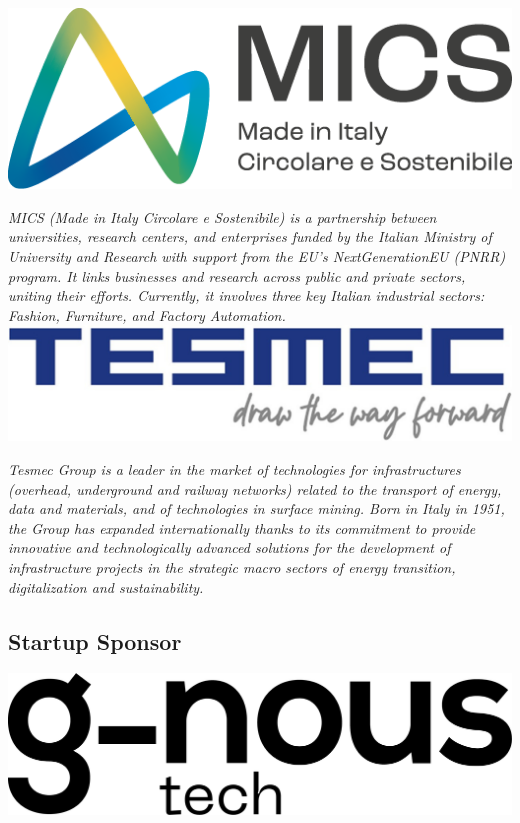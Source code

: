 \documentclass[
	openany, %
	parskip=full, %
	12pt, %
	a4paper, %
]{conferencebooklet} %
\begin{document}
\begin{multicols*}{2}
    \hfill\includegraphics[width=\sponsorscaling\linewidth]{logos/mics.png}\hspace*{\fill}
    
    \textit{MICS (Made in Italy Circolare e Sostenibile) is a partnership between universities, research centers, and enterprises funded by the Italian Ministry of University and Research with support from the EU's NextGenerationEU (PNRR) program. It links businesses and research across public and private sectors, uniting their efforts. Currently, it involves three key Italian industrial sectors: Fashion, Furniture, and Factory Automation.} \\

   
    \hfill\includegraphics[width=\sponsorscaling\linewidth]{logos/tesmec.jpg}\hspace*{\fill}
    
    \textit{Tesmec Group is a leader in the market of technologies for infrastructures (overhead, underground and railway networks) related to the transport of energy, data and materials, and of technologies in surface mining. Born in Italy in 1951, the Group has expanded internationally thanks to its commitment to provide innovative and technologically advanced solutions for the development of infrastructure projects in the strategic macro sectors of energy transition, digitalization and sustainability.} \\


    \subsection{Startup Sponsor}    \hfill\includegraphics[width=\sponsorscaling\linewidth]{logos/gnous.png}\hspace*{\fill}
    

\end{multicols*}
\end{document}
